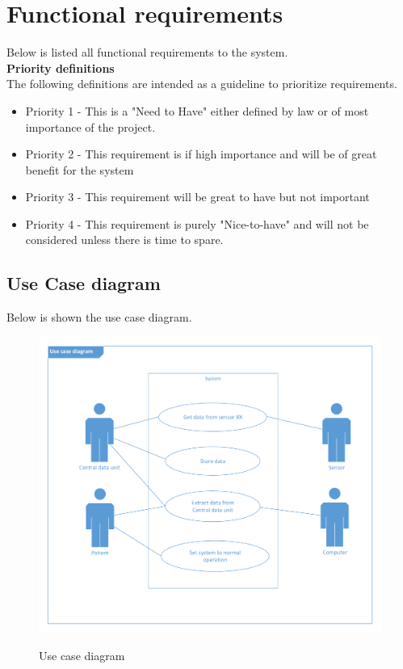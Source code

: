 
\section{Functional requirements}
Below is listed all functional requirements to the system.\\
\textbf{\large{Priority definitions}}\\
The following definitions are intended as a guideline to prioritize requirements.
\begin{itemize}[noitemsep,nolistsep]
\item Priority 1 - This is a "Need to Have" either defined by law or of most importance of the project.
\item Priority 2 - This requirement is if high importance and will be of great benefit for the system
\item Priority 3 - This requirement will be great to have but not important
\item Priority 4 - This requirement is purely "Nice-to-have" and will not be considered unless there is time to spare.
\end{itemize}

\subsection{Use Case diagram}
Below is shown the use case diagram.
\begin{figure}[H]
\centering
\includegraphics*[width=.7\textwidth]{billeder/UseCase_vector}
\label{usecase_fig}
\caption{Use case diagram}
\end{figure}

